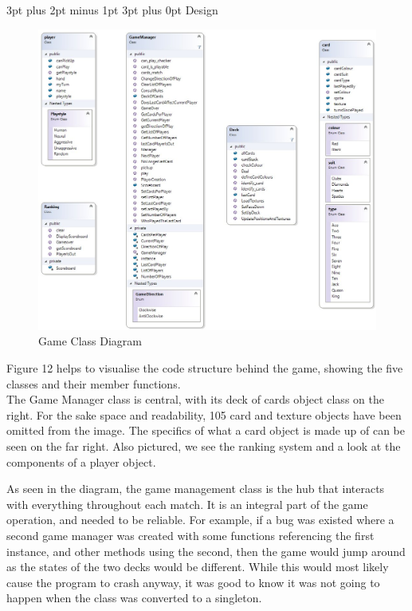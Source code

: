 \documentclass[12pt,a4paper]{article}
\makeatletter
\renewcommand\subsection{\@startsection {subsection}{1}{2mm} %
                               {3pt plus 2pt minus 1pt} %
                               {3pt plus 0pt} %
                               {\normalfont\bfseries}}
\makeatother
\begin{document}
\subsection{Design}

\begin{figure}[h]
	\centering
	\includegraphics[width = \textwidth]{ClassDiagram.jpg}
	\caption{Game Class Diagram}
\end{figure}
Figure 12 helps to visualise the code structure behind the game, showing the five classes and their member functions. \\

The Game Manager class is central, with its deck of cards object class on the right. For the sake space and readability, 105 card and texture objects have been omitted from the image. The specifics of what a card object is made up of can be seen on the far right. Also pictured, we see the ranking system and a look at the components of a player object.

As seen in the diagram, the game management class is the hub that interacts with everything throughout each match. It is an integral part of the game operation, and needed to be reliable. For example, if a bug was existed where a second game manager was created with some functions referencing the first instance, and other methods using the second, then the game would jump around as the states of the two decks would be different. While this would most likely cause the program to crash anyway, it was good to know it was not going to happen when the class was converted to a singleton.\\
\end{document}
